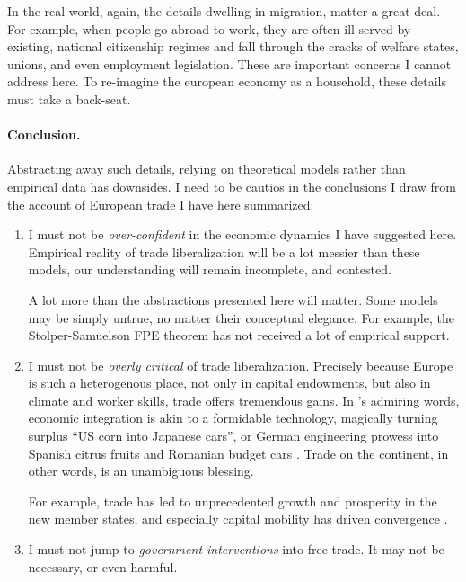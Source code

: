 \documentclass[11pt,a4paper,oneside,openright]{article}
\begin{document}
In the real world, again, the details dwelling in migration, matter a great deal. 
For example, when people go abroad to work, they are often ill-served by existing, national citizenship regimes and fall through the cracks of welfare states, unions, and even employment legislation. 
These are important concerns I cannot address here. 
To re-imagine the european economy as a household, these details must take a back-seat.

\paragraph{Conclusion.} Abstracting away such details, relying on theoretical models rather than empirical data has downsides. 
I need to be cautios in the conclusions I draw from the account of European trade I have here summarized: 
\begin{enumerate}
	\item I must not be \emph{over-confident} in the economic dynamics I have suggested here. 
	Empirical reality of trade liberalization will be a lot messier than these models, our understanding will remain incomplete, and contested. 
	
	A lot more than the abstractions presented here will matter. 
	Some models may  be simply untrue, no matter their conceptual elegance. 
	For example, the Stolper-Samuelson \gls{FPE} theorem has not received a lot of empirical support. 
	
	\item I must not be \emph{overly critical} of trade liberalization. 
	Precisely because Europe is such a heterogenous place, not only in capital endowments, but also in climate and worker skills, trade offers tremendous gains. 
	In \citeauthor{Mankiw-2004-aa}'s admiring words, economic integration is akin to a formidable technology, magically turning surplus ``US corn into Japanese cars'', or German engineering prowess into Spanish citrus fruits and Romanian budget cars \citeyearpar[212]{Mankiw-2004-aa}. 
	Trade on the continent, in other words, is an unambiguous blessing. 
	
	For example, trade has led to unprecedented growth and prosperity in the new member states, and especially capital mobility has driven convergence \citep{Abiad2007}. %
	
	\item I must not jump to \emph{government interventions} into free trade. 
	It may not be necessary, or even harmful.
	

\end{enumerate}
\end{document}
